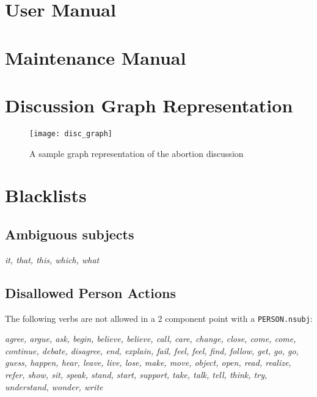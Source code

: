 \begin{appendices}
    \makeatletter
    \makeatother

    \chapter{User Manual}
      


    \chapter{Maintenance Manual\label{app:maintain}}
      

    \chapter{Discussion Graph Representation\label{app:disc_graph}}
      \begin{figure}[h]
        \centering
        \texttt{[image: disc\_graph]}
        \caption{A sample graph representation of the abortion discussion}
      \end{figure}

    \chapter{Blacklists\label{app:blacklists}}
      \section{Ambiguous subjects}
        \textit{it, that, this, which, what}

      \section{Disallowed Person Actions}
        The following verbs are not allowed in a 2 component point with a \texttt{PERSON.nsubj}:

        \textit{agree, argue, ask, begin, believe, believe, call, care, change, close, come, come, continue, debate, disagree, end, explain, fail, feel, feel, find, follow, get, go, go, guess, happen, hear, leave, live, lose, make, move, object, open, read, realize, refer, show, sit, speak, stand, start, support, take, talk, tell, think, try, understand, wonder, write}


\end{appendices}
